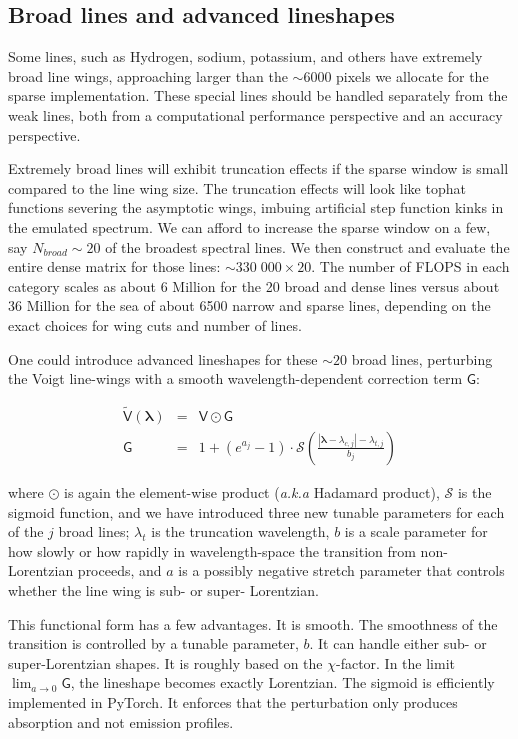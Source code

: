 \documentclass[modern]{aastex631}
\begin{document}
\subsection{Broad lines and advanced lineshapes}

Some lines, such as Hydrogen, sodium, potassium, and others have extremely broad line wings, approaching larger than the $\sim6000$ pixels we allocate for the sparse implementation. These special lines should be handled separately from the weak lines, both from a computational performance perspective and an accuracy perspective.

Extremely broad lines will exhibit truncation effects if the sparse window is small compared to the line wing size. The truncation effects will look like tophat functions severing the asymptotic wings, imbuing artificial step function kinks in the emulated spectrum. We can afford to increase the sparse window on a few, say $N_{broad}\sim20$ of the broadest spectral lines. We then construct and evaluate the entire dense matrix for those lines: $\sim 330\;000 \times 20$. The number of FLOPS in each category scales as about 6 Million for the 20 broad and dense lines versus about 36 Million for the sea of about 6500 narrow and sparse lines, depending on the exact choices for wing cuts and number of lines.

One could introduce advanced lineshapes for these $\sim20$ broad lines, perturbing the Voigt line-wings with a smooth wavelength-dependent correction term $\mathsf{G}$:

\begin{eqnarray}
    \mathsf{\tilde{V}(\bm{\lambda})} &=& \mathsf{V} \odot \mathsf{G}\\
    \mathsf{G} &=& 1 + (e^{a_j} - 1) \cdot \mathcal{S}\left(\frac{|\bm{\lambda}-\lambda_{c,j}| - \lambda_{t, j}}{b_j}\right)
\end{eqnarray}

where $\odot$ is again the element-wise product (\emph{a.k.a} Hadamard product), $\mathcal{S}$ is the sigmoid function, and we have introduced three new tunable parameters for each of the $j$ broad lines; $\lambda_t$ is the truncation wavelength, $b$ is a scale parameter for how slowly or how rapidly in wavelength-space the transition from non-Lorentzian proceeds, and $a$ is a possibly negative stretch parameter that controls whether the line wing is sub- or super- Lorentzian.

This functional form has a few advantages. It is smooth. The smoothness of the transition is controlled by a tunable parameter, $b$. It can handle either sub- or super-Lorentzian shapes. It is roughly based on the $\chi$-factor. In the limit $\lim_{a\to0} \mathsf{G}$, the lineshape becomes exactly Lorentzian. The sigmoid is efficiently implemented in PyTorch.
It enforces that the perturbation only produces absorption and not emission profiles.
\end{document}
